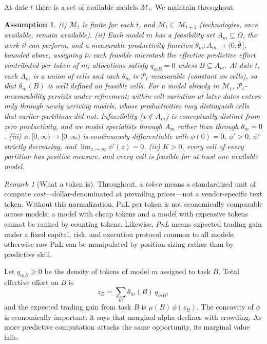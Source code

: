 \documentclass[11pt]{article}
\newtheorem{assumption}{Assumption}
\theoremstyle{definition}
\theoremstyle{remark}
\newtheorem{remark}{Remark}
\begin{document}
At date $t$ there is a set of available models $\mathcal{M}_t$. We maintain throughout:

\begin{assumption}
\label{ass:models}
(i) $\mathcal{M}_t$ is finite for each $t$, and $\mathcal{M}_t \subseteq \mathcal{M}_{t+1}$ (technologies, once available, remain available).
(ii) Each model $m$ has a feasibility set $A_m \subseteq \Omega$, the work it can perform, and a measurable productivity function $\theta_m : A_m \to (0, \bar\theta\,]$, bounded above, assigning to each feasible microtask the \emph{effective predictive effort} contributed per token of $m$; allocations satisfy $q_{mB} = 0$ unless $B \subseteq A_m$. At date $t$, each $A_m$ is a union of cells and each $\theta_m$ is $\mathcal{P}_t$-measurable (constant on cells), so that $\theta_m(B)$ is well defined on feasible cells. For a model already in $\mathcal{M}_t$, $\mathcal{P}_t$-measurability persists under refinement; within-cell variation at later dates enters only through newly arriving models, whose productivities may distinguish cells that earlier partitions did not. Infeasibility ($x \notin A_m$) is conceptually distinct from zero productivity, and we model specialists through $A_m$ rather than through $\theta_m = 0$.
(iii) $\phi : [0,\infty) \to [0,\infty)$ is continuously differentiable with $\phi(0) = 0$, $\phi' > 0$, $\phi'$ strictly decreasing, and $\lim_{z \to \infty} \phi'(z) = 0$.
(iv) $K > 0$, every cell of every partition has positive measure, and every cell is feasible for at least one available model.
\end{assumption}

\begin{remark}[What a token is]
\label{rem:token}
Throughout, a \emph{token} means a standardized unit of compute \emph{cost}---dollar-denominated at prevailing prices---not a vendor-specific text token. Without this normalization, PnL per token is not economically comparable across models: a model with cheap tokens and a model with expensive tokens cannot be ranked by counting tokens. Likewise, \emph{PnL} means expected trading gain under a fixed capital, risk, and execution protocol common to all models; otherwise raw PnL can be manipulated by position sizing rather than by predictive skill.
\end{remark}

Let $q_{mB} \ge 0$ be the density of tokens of model $m$ assigned to task $B$. Total effective effort on $B$ is
\begin{equation}
z_B = \sum_{m} \theta_m(B)\, q_{mB},
\end{equation}
and the expected trading gain from task $B$ is $\mu(B)\,\phi(z_B)$. The concavity of $\phi$ is economically important: it says that marginal alpha declines with crowding. As more predictive computation attacks the same opportunity, its marginal value falls.
\end{document}
